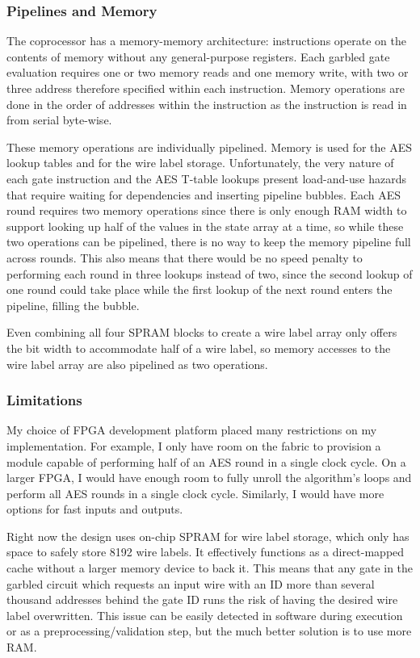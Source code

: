 \subsubsection{Pipelines and Memory}
The coprocessor has a memory-memory architecture: instructions operate on the contents of memory without any general-purpose registers. Each garbled gate evaluation requires one or two memory reads and one memory write, with two or three address therefore specified within each instruction. Memory operations are done in the order of addresses within the instruction as the instruction is read in from serial byte-wise.

These memory operations are individually pipelined. Memory is used for the AES lookup tables and for the wire label storage. Unfortunately, the very nature of each gate instruction and the AES T-table lookups present load-and-use hazards that require waiting for dependencies and inserting pipeline bubbles. Each AES round requires two memory operations since there is only enough RAM width to support looking up half of the values in the state array at a time, so while these two operations can be pipelined, there is no way to keep the memory pipeline full across rounds. This also means that there would be no speed penalty to performing each round in three lookups instead of two, since the second lookup of one round could take place while the first lookup of the next round enters the pipeline, filling the bubble.

Even combining all four SPRAM blocks to create a wire label array only offers the bit width to accommodate half of a wire label, so memory accesses to the wire label array are also pipelined as two operations.

\subsubsection{Limitations}
My choice of FPGA development platform placed many restrictions on my implementation. For example, I only have room on the fabric to provision a module capable of performing half of an AES round in a single clock cycle. On a larger FPGA, I would have enough room to fully unroll the algorithm's loops and perform all AES rounds in a single clock cycle. Similarly, I would have more options for fast inputs and outputs.

Right now the design uses on-chip SPRAM for wire label storage, which only has space to safely store 8192 wire labels. It effectively functions as a direct-mapped cache without a larger memory device to back it. This means that any gate in the garbled circuit which requests an input wire with an ID more than several thousand addresses behind the gate ID runs the risk of having the desired wire label overwritten. This issue can be easily detected in software during execution or as a preprocessing/validation step, but the much better solution is to use more RAM.

